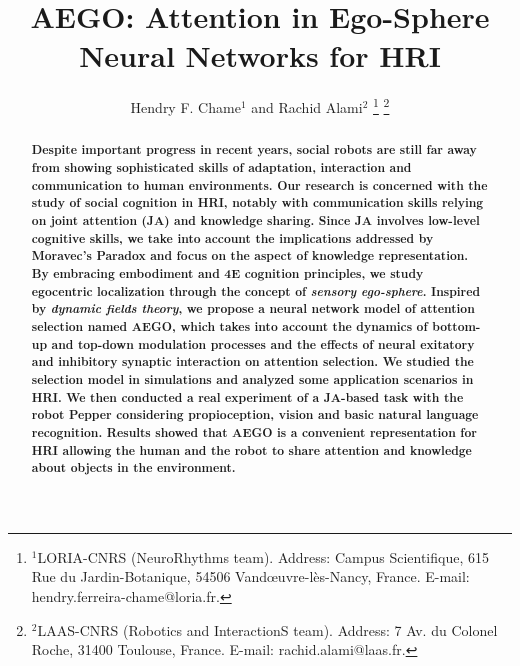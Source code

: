 \documentclass[letterpaper, 10 pt, conference]{ieeeconf}  %
\title{\LARGE \bf
	AEGO: Attention in Ego-Sphere Neural Networks for HRI 
}
\author{Hendry F. Chame$^{1}$ and Rachid Alami$^{2}$%
	\thanks{$^{1}$LORIA-CNRS (NeuroRhythms team). Address: Campus Scientifique, 615 Rue du Jardin-Botanique, 54506 Vand\oe uvre-l\`es-Nancy, France.
		{\small E-mail: hendry.ferreira-chame@loria.fr}.}%
	\thanks{$^{2}$LAAS-CNRS (Robotics and InteractionS team). Address: 7 Av. du Colonel Roche, 31400 Toulouse, France.
		{\small E-mail: rachid.alami@laas.fr}.}%
}
\begin{document}
		
	
	\maketitle
	\thispagestyle{empty}
	\pagestyle{empty}
	
	
	\begin{abstract}
		
		
		\small \bf Despite important progress in recent years, social robots are still far away from showing sophisticated skills of adaptation, interaction and communication to human environments. Our research is concerned with the study of social cognition in HRI, notably with communication skills relying on joint attention (JA) and knowledge sharing. Since JA involves low-level cognitive skills, we take into account the implications addressed by Moravec's Paradox and focus on the aspect of knowledge representation. By embracing embodiment and 4E cognition principles, we study egocentric localization through the concept of \textit{sensory ego-sphere}. Inspired by \textit{dynamic fields theory}, we	propose a neural network model of attention selection named AEGO, which takes into account the dynamics of bottom-up and top-down modulation processes and the effects of neural exitatory and inhibitory synaptic interaction on attention selection. We studied the selection model in simulations and analyzed some application scenarios in HRI. We then conducted a real experiment of a JA-based task with the robot Pepper considering propioception, vision and basic natural language recognition. Results showed that AEGO is a convenient representation for HRI allowing the human and the robot to share attention and knowledge about objects in the environment.
		

\end{abstract}
\end{document}
